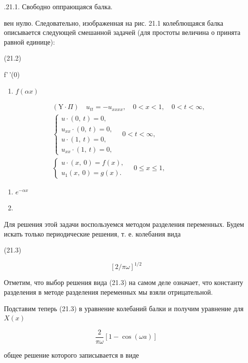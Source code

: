 \documentclass[
  ukrainian,
]{article}
\providecommand{\tightlist}{%
  \setlength{\itemsep}{0pt}\setlength{\parskip}{0pt}}
\begin{document}
.21.1. Свободно оппрающаяся балка.

вен нулю. Следовательно, изображенная на рис. 21.1 колеблющаяся балка
описывается следующей смешанной задачей (для простоты величина о принята
равной единице):

(21.2)

f'\,'(0)

\begin{enumerate}
\def\labelenumi{\arabic{enumi}.}
\setcounter{enumi}{1}
\tightlist
\item
  \(f(\alpha x)\)
\end{enumerate}

\[
\begin{aligned} & (\text{Y} \cdot \Pi) \quad u_{tt} = -u_{xxxx}, \quad 0 < x < 1, \quad 0 < t < \infty, \\ & \begin{cases} u \cdot (0, \ t) = 0, \\ u_{xx} \cdot (0, \ t) = 0, \\ u \cdot (1, \ t) = 0, \\ u_{xx} \cdot (1, \ t) = 0, \end{cases} \quad 0 < t < \infty, \\ & \begin{cases} u \cdot (x, \ 0) = f(x), \\ u_{1}(x, \ 0) = g(x). \end{cases} \quad 0 \leqslant x \leqslant 1, \end{aligned}
\]

\begin{enumerate}
\def\labelenumi{\arabic{enumi}.}
\setcounter{enumi}{2}
\item
  \(e^{-\alpha x}\)
\item
\end{enumerate}

Для решения этой задачи воспользуемся методом разделения переменных.
Будем искать только периодические решения, т. е. колебания вида

(21.3)

\[
[2/\pi\omega]^{1/2}
\]

Отметим, что выбор решения вида (21.3) на самом деле означает, что
константу разделения в методе разделения переменных мы взяли
отрицательной.

Подставим теперь (21.3) в уравнение колебаний балки и получим уравнение
для \(X\left(x\right)\)

\[
\frac{2}{\pi\omega} [1-\cos(\omega a)]
\]

общее решение которого записывается в виде
\end{document}
